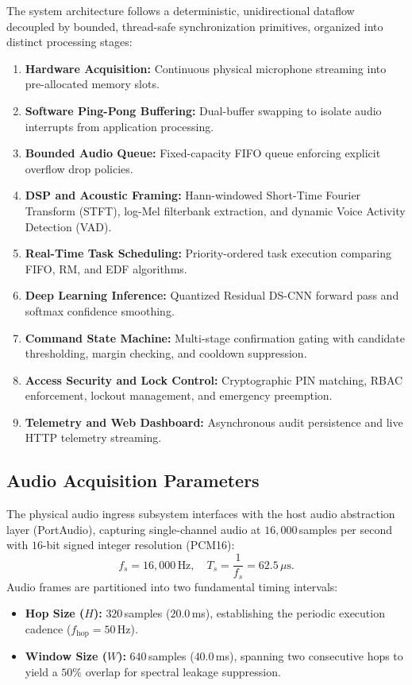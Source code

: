 \documentclass[10pt,twocolumn,letterpaper]{article}
\begin{document}
The system architecture follows a deterministic, unidirectional dataflow decoupled by bounded, thread-safe synchronization primitives, organized into distinct processing stages:
\begin{enumerate}
    \item \textbf{Hardware Acquisition:} Continuous physical microphone streaming into pre-allocated memory slots.
    \item \textbf{Software Ping-Pong Buffering:} Dual-buffer swapping to isolate audio interrupts from application processing.
    \item \textbf{Bounded Audio Queue:} Fixed-capacity FIFO queue enforcing explicit overflow drop policies.
    \item \textbf{DSP and Acoustic Framing:} Hann-windowed Short-Time Fourier Transform (STFT), log-Mel filterbank extraction, and dynamic Voice Activity Detection (VAD).
    \item \textbf{Real-Time Task Scheduling:} Priority-ordered task execution comparing FIFO, RM, and EDF algorithms.
    \item \textbf{Deep Learning Inference:} Quantized Residual DS-CNN forward pass and softmax confidence smoothing.
    \item \textbf{Command State Machine:} Multi-stage confirmation gating with candidate thresholding, margin checking, and cooldown suppression.
    \item \textbf{Access Security and Lock Control:} Cryptographic PIN matching, RBAC enforcement, lockout management, and emergency preemption.
    \item \textbf{Telemetry and Web Dashboard:} Asynchronous audit persistence and live HTTP telemetry streaming.
\end{enumerate}

\subsection{Audio Acquisition Parameters}

The physical audio ingress subsystem interfaces with the host audio abstraction layer (PortAudio), capturing single-channel audio at $16{,}000$\,samples per second with $16$-bit signed integer resolution (PCM16):
\begin{equation}
    f_s = 16{,}000\,\text{Hz}, \quad T_s = \frac{1}{f_s} = 62.5\,\mu\text{s}.
\end{equation}
Audio frames are partitioned into two fundamental timing intervals:
\begin{itemize}
    \item \textbf{Hop Size ($H$):} $320$\,samples ($20.0$\,ms), establishing the periodic execution cadence ($f_{\text{hop}} = 50$\,Hz).
    \item \textbf{Window Size ($W$):} $640$\,samples ($40.0$\,ms), spanning two consecutive hops to yield a $50\%$ overlap for spectral leakage suppression.
\end{itemize}
\end{document}
